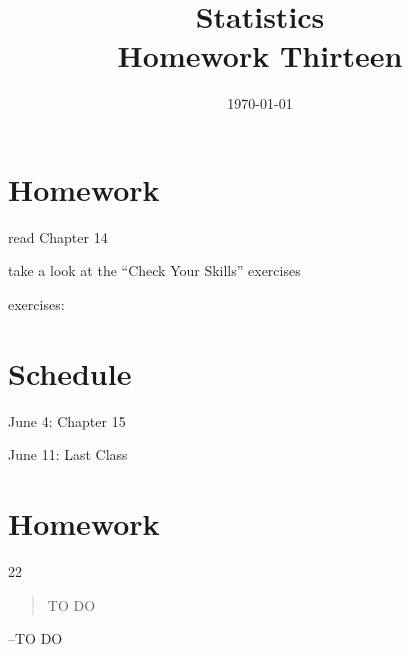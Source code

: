 \documentclass[letterpaper]{exam}
\title{Statistics \\ Homework Thirteen}
\date{\today}
\author{}
\begin{document}
  \maketitle

  \section{Homework}
  \ifprintanswers
  \else
    \begin{itemize*}
      \item read Chapter 14 
      \item take a look at the ``Check Your Skills'' exercises
      \item exercises: 
    \end{itemize*}
  \fi

  \section{Schedule}
  \begin{itemize*}
    \item June 4: Chapter 15
    \item June 11: Last Class
  \end{itemize*}

  \ifprintanswers
    \section{Homework}
    \begin{description}

      \item[22] 

  \end{description}

  \else
    \vspace{7 cm}
    \begin{quote}
      \begin{em}
        TO DO
      \end{em}
    \end{quote}
    \hspace{1 cm}--TO DO
  \fi
\end{document}
